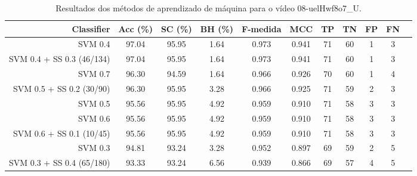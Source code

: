 \begin{table}[!htb]
\centering
\caption{Resultados dos métodos de aprendizado de máquina para o vídeo 08-uelHwf8o7_U.}
\label{tab:08-uelHwf8o7_U}
\begin{tabular}{r|c|c|c|c|c|c|c|c|c|c}
\hline\hline
Classifier & Acc (\%) & SC (\%) & BH (\%) & F-medida & MCC & TP & TN & FP & FN \\ \hline
SVM 0.4 & 97.04 & 95.95 & 1.64 & 0.973 & 0.941 & 71 & 60 & 1 & 3 \\ 
SVM 0.4 + SS 0.3 (46/134) & 97.04 & 95.95 & 1.64 & 0.973 & 0.941 & 71 & 60 & 1 & 3 \\ 
SVM 0.7 & 96.30 & 94.59 & 1.64 & 0.966 & 0.926 & 70 & 60 & 1 & 4 \\ 
SVM 0.5 + SS 0.2 (30/90) & 96.30 & 95.95 & 3.28 & 0.966 & 0.925 & 71 & 59 & 2 & 3 \\ 
SVM 0.5 & 95.56 & 95.95 & 4.92 & 0.959 & 0.910 & 71 & 58 & 3 & 3 \\ 
SVM 0.6 & 95.56 & 95.95 & 4.92 & 0.959 & 0.910 & 71 & 58 & 3 & 3 \\ 
SVM 0.6 + SS 0.1 (10/45) & 95.56 & 95.95 & 4.92 & 0.959 & 0.910 & 71 & 58 & 3 & 3 \\ 
SVM 0.3 & 94.81 & 93.24 & 3.28 & 0.952 & 0.897 & 69 & 59 & 2 & 5 \\ 
SVM 0.3 + SS 0.4 (65/180) & 93.33 & 93.24 & 6.56 & 0.939 & 0.866 & 69 & 57 & 4 & 5 \\ 
\hline\hline
\end{tabular}
\end{table}
